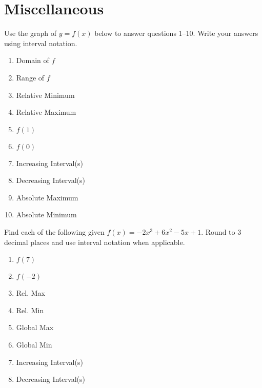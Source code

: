 \section{Miscellaneous}

Use the graph of $y = f(x)$ below to answer questions 1--10. Write your answers using interval notation.
\begin{center}
\end{center}

\begin{enumerate}
\item Domain of $f$
\item Range of $f$
\item Relative Minimum
\item Relative Maximum
\item $f(1)$
\item $f(0)$
\item Increasing Interval(s)
\item Decreasing Interval(s)
\item Absolute Maximum
\item Absolute Minimum
\setcounter{Review}{\value{enumi}}
\end{enumerate}

Find each of the following given $f(x) = -2x^{3}+6x^{2}-5x+1$. Round to 3 decimal places and use interval notation when applicable.
\begin{enumerate}
\setcounter{enumi}{\value{Review}}
\item $f(7)$
\item $f(-2)$
\item Rel. Max
\item Rel. Min
\item Global Max
\item Global Min
\item Increasing Interval(s)
\item Decreasing Interval(s)
\end{enumerate}


